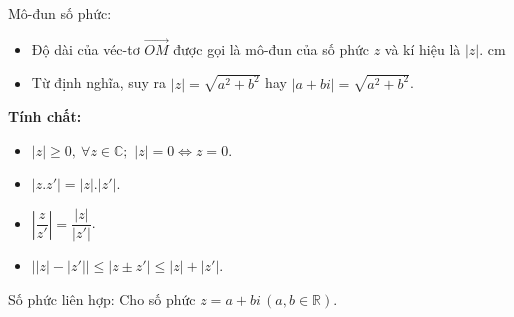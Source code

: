 \begin{tomtat}
\begin{boxdl}
{
		}
	\end{boxdl}
	\begin{boxdn}
		 Mô-đun số phức:
		\begin{itemize}
			\item Độ dài của véc-tơ $ \overrightarrow{OM} $ được gọi là mô-đun của số phức $ z $ và kí hiệu là $ |z| $.
			 cm
			\item Từ định nghĩa, suy ra $\boxed{|z|=\sqrt{a^2+b^2}}$ hay $ \boxed{\left|a+bi\right|=\sqrt{a^2+b^2}}$.
		\end{itemize}
		\textbf{Tính chất:}
		\begin{multicols}{2}
			\begin{itemize}
				\item $|z|\ge 0, \ \forall z\in \mathbb{C}; $ $|z|=0\Leftrightarrow z=0$. 
				\item $\left|z. z'\right|=|z|. \left|z'\right|$. 
				\item $\left|\dfrac{z}{z'}\right|=\dfrac{|z|}{\left|z'\right|}$. 
				\item $\left||z|- \left|z'\right|\right|\le \left|z\pm z'\right|\le |z|+ \left|z'\right|$. 
			\end{itemize}
		\end{multicols}
	\end{boxdn}
	\begin{boxdl}
		Số phức liên hợp: Cho số phức $ z=a+bi \,\left(a, b\in \mathbb{R}\right)$.
\end{boxdl}
\end{tomtat}
